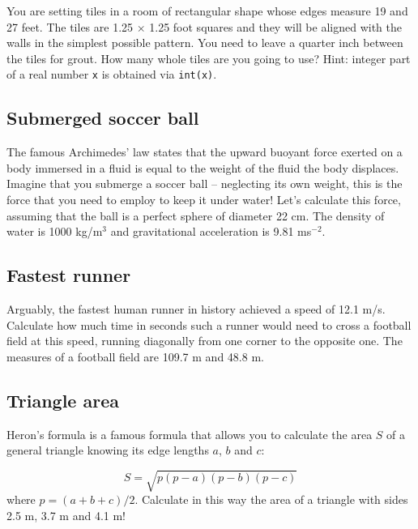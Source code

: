 You are setting tiles in a room of rectangular shape whose edges measure 19 and 27 feet. 
The tiles are 1.25 $\times$ 1.25 foot squares and they will be aligned with the walls
in the simplest possible pattern. You need 
to leave a quarter inch between the tiles for grout. How many whole tiles are you going to use?
Hint: integer part of a real number {\tt x} is obtained via {\tt int(x)}.


\subsection{Submerged soccer ball}

The famous Archimedes' law states that the upward buoyant force exerted on a body 
immersed in a fluid is equal to the weight of the fluid the body displaces.
Imagine that you submerge a soccer ball -- neglecting its own weight, this 
is the force that you need to employ to keep it under water! Let's calculate 
this force, assuming that the ball is a perfect sphere of diameter 22 cm.
The density of water is 1000 kg/m${^3}$ and gravitational acceleration 
is 9.81 ms${^{-2}}$. 


\subsection{Fastest runner}

Arguably, the fastest human runner in history achieved a speed of 12.1 m/s. 
Calculate how much time in seconds such a runner would need to cross a football 
field at this speed, running diagonally from one corner to the opposite one. 
The measures of a football field are 109.7 m and 48.8 m. 


\subsection{Triangle area}

Heron's formula is a famous formula that allows you to calculate the area $S$ of a 
general triangle knowing its edge lengths $a$, $b$ and $c$:

$$
S = \sqrt{p(p-a)(p-b)(p-c)}
$$
where $p = (a + b + c)/2$. Calculate in this way the area of a triangle with sides 
2.5 m, 3.7 m and 4.1 m!

